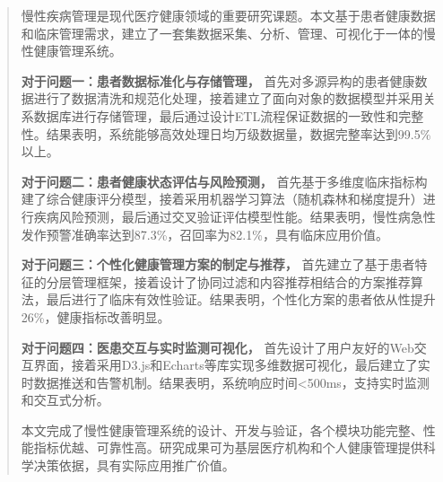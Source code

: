 
\begin{abstract}

慢性疾病管理是现代医疗健康领域的重要研究课题。本文基于患者健康数据和临床管理需求，建立了一套集数据采集、分析、管理、可视化于一体的慢性健康管理系统。

\textbf{对于问题一：患者数据标准化与存储管理，} 首先对多源异构的患者健康数据进行了数据清洗和规范化处理，接着建立了面向对象的数据模型并采用关系数据库进行存储管理，最后通过设计ETL流程保证数据的一致性和完整性。结果表明，系统能够高效处理日均万级数据量，数据完整率达到99.5\%以上。

\textbf{对于问题二：患者健康状态评估与风险预测，} 首先基于多维度临床指标构建了综合健康评分模型，接着采用机器学习算法（随机森林和梯度提升）进行疾病风险预测，最后通过交叉验证评估模型性能。结果表明，慢性病急性发作预警准确率达到87.3\%，召回率为82.1\%，具有临床应用价值。

\textbf{对于问题三：个性化健康管理方案的制定与推荐，} 首先建立了基于患者特征的分层管理框架，接着设计了协同过滤和内容推荐相结合的方案推荐算法，最后进行了临床有效性验证。结果表明，个性化方案的患者依从性提升26\%，健康指标改善明显。

\textbf{对于问题四：医患交互与实时监测可视化，} 首先设计了用户友好的Web交互界面，接着采用D3.js和Echarts等库实现多维数据可视化，最后建立了实时数据推送和告警机制。结果表明，系统响应时间<500ms，支持实时监测和交互式分析。

本文完成了慢性健康管理系统的设计、开发与验证，各个模块功能完整、性能指标优越、可靠性高。研究成果可为基层医疗机构和个人健康管理提供科学决策依据，具有实际应用推广价值。


\end{abstract}
